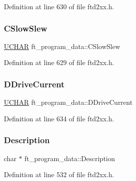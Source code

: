 Definition at line 630 of file ftd2xx.\+h.

\mbox{\label{structft__program__data_a341949c5fa53d8f43deb3d37cba5a409}} 
\subsubsection{\texorpdfstring{C\+Slow\+Slew}{CSlowSlew}}
{\footnotesize\ttfamily \hyperlink{CatCaloProto40MHz_2inc_2WinTypes_8h_a4f4bb67531a9bf6f0b9c6ad76aeba587}{U\+C\+H\+AR} ft\+\_\+program\+\_\+data\+::\+C\+Slow\+Slew}



Definition at line 629 of file ftd2xx.\+h.

\mbox{\label{structft__program__data_ae67162da23ce721b3ac18d019c255118}} 
\subsubsection{\texorpdfstring{D\+Drive\+Current}{DDriveCurrent}}
{\footnotesize\ttfamily \hyperlink{CatCaloProto40MHz_2inc_2WinTypes_8h_a4f4bb67531a9bf6f0b9c6ad76aeba587}{U\+C\+H\+AR} ft\+\_\+program\+\_\+data\+::\+D\+Drive\+Current}



Definition at line 634 of file ftd2xx.\+h.

\mbox{\label{structft__program__data_a254c31fdadcc3ce3748f6682083874a8}} 
\subsubsection{\texorpdfstring{Description}{Description}}
{\footnotesize\ttfamily char $\ast$ ft\+\_\+program\+\_\+data\+::\+Description}



Definition at line 532 of file ftd2xx.\+h.

